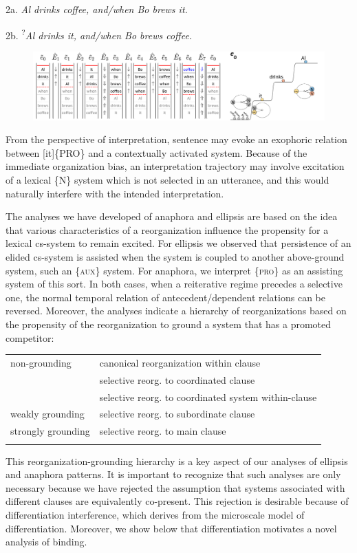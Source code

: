   2a.  \textit{Al drinks coffee, and/when Bo brews it.}  

  2b.  \textsuperscript{?}\textit{Al drinks it, and/when Bo brews coffee.}

  
\begin{figure}
\includegraphics[width=\textwidth]{figures/Tilsen-img155.png}
\caption{\missingcaption}
\label{fig:}
\end{figure}
 

  From the perspective of interpretation, sentence  may evoke an exophoric relation between [it]\{PRO\} and a contextually activated system. Because of the immediate organization bias, an interpretation trajectory may involve excitation of a lexical \{N\} system which is not selected in an utterance, and this would naturally interfere with the intended interpretation. 

  The analyses we have developed of anaphora and ellipsis are based on the idea that various characteristics of a reorganization influence the propensity for a lexical cs-system to remain excited. For ellipsis we observed that persistence of an elided cs-system is assisted when the system is coupled to another above-ground system, such an \{\textsc{aux}\} system. For anaphora, we interpret \{\textsc{pro}\} as an assisting system of this sort. In both cases, when a reiterative regime precedes a selective one, the normal temporal relation of antecedent/dependent relations can be reversed. Moreover, the analyses indicate a hierarchy of reorganizations based on the propensity of the reorganization to ground a system that has a promoted competitor:

\begin{tabularx}{\textwidth}{XX}
\lsptoprule
non-grounding & canonical reorganization within clause\\
& selective reorg. to coordinated clause\\
& selective reorg. to coordinated system within-clause\\
weakly grounding & selective reorg. to subordinate clause\\
strongly grounding & selective reorg. to main clause\\
\lspbottomrule
\end{tabularx}
  This reorganization-grounding hierarchy is a key aspect of our analyses of ellipsis and anaphora patterns. It is important to recognize that such analyses are only necessary because we have rejected the assumption that systems associated with different clauses are equivalently co-present. This rejection is desirable because of differentiation interference, which derives from the microscale model of differentiation. Moreover, we show below that differentiation motivates a novel analysis of binding.

